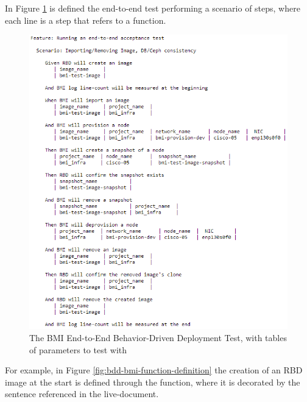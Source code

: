 In Figure \ref{fig:bdd-bmi-end-to-end-template} is defined the end-to-end test performing a scenario of steps, where each line is a step that refers to a function.

\pagebreak

\begin{figure}[!h] 
\begin{center}
\includegraphics[scale=1]{figures/end-to-end-bdd-template.png}
\end{center}
\caption{The BMI End-to-End Behavior-Driven Deployment Test, with tables of parameters to test with}
\label{fig:bdd-bmi-end-to-end-template}
\end{figure}

For example, in Figure \ref{fig:bdd-bmi-function-definition} the creation of an RBD image at the start is defined through the  function, where it is decorated by the sentence referenced in the live-document.


